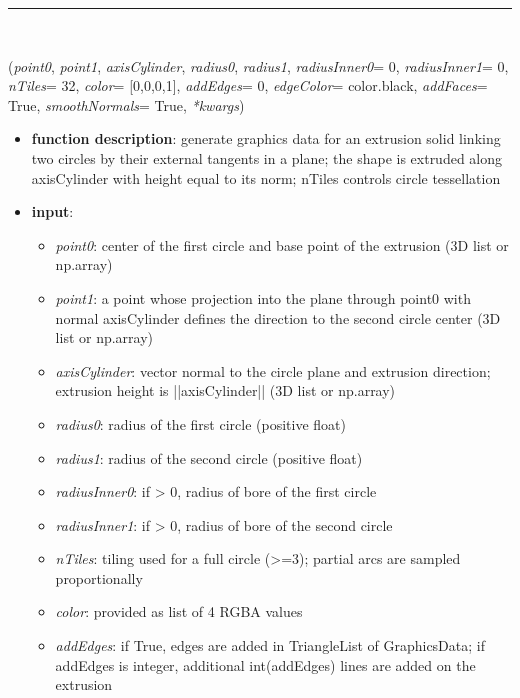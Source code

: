 \begin{itemize}[leftmargin=1.4cm]
\begin{itemize}[leftmargin=1.4cm]
\begin{itemize}[leftmargin=1.4cm]
\begin{itemize}[leftmargin=0.5cm]
\begin{itemize}[leftmargin=1.4cm]
\begin{itemize}[leftmargin=1.4cm]
\begin{itemize}[leftmargin=1.4cm]
\begin{itemize}[leftmargin=0.5cm]
\begin{itemize}[leftmargin=1.4cm]
%
\noindent\rule{8cm}{0.75pt}\vspace{1pt} \\ 
\begin{flushleft}
\label{sec:graphics:LinkedCylinders}
({\it point0}, {\it point1}, {\it axisCylinder}, {\it radius0}, {\it radius1}, {\it radiusInner0}= 0, {\it radiusInner1}= 0, {\it nTiles}= 32, {\it color}= [0,0,0,1], {\it addEdges}= 0, {\it edgeColor}= color.black, {\it addFaces}= True, {\it smoothNormals}= True, {\it **kwargs})
\end{flushleft}
\setlength{\itemindent}{0.7cm}
\begin{itemize}[leftmargin=0.7cm]
\item[--]
{\bf function description}: generate graphics data for an extrusion solid linking two circles by their external tangents in a plane; the shape is extruded along axisCylinder with height equal to its norm; nTiles controls circle tessellation
\item[--]
{\bf input}: \vspace{-6pt}
\begin{itemize}[leftmargin=1.2cm]
\setlength{\itemindent}{-0.7cm}
\item[]{\it point0}: center of the first circle and base point of the extrusion (3D list or np.array)
\item[]{\it point1}: a point whose projection into the plane through point0 with normal axisCylinder defines the direction to the second circle center (3D list or np.array)
\item[]{\it axisCylinder}: vector normal to the circle plane and extrusion direction; extrusion height is ||axisCylinder|| (3D list or np.array)
\item[]{\it radius0}: radius of the first circle (positive float)
\item[]{\it radius1}: radius of the second circle (positive float)
\item[]{\it radiusInner0}: if > 0, radius of bore of the first circle
\item[]{\it radiusInner1}: if > 0, radius of bore of the second circle
\item[]{\it nTiles}: tiling used for a full circle (>=3); partial arcs are sampled proportionally
\item[]{\it color}: provided as list of 4 RGBA values
\item[]{\it addEdges}: if True, edges are added in TriangleList of GraphicsData; if addEdges is integer, additional int(addEdges) lines are added on the extrusion

\end{itemize}
\end{itemize}
\end{itemize}
\end{itemize}
\end{itemize}
\end{itemize}
\end{itemize}
\end{itemize}
\end{itemize}
\end{itemize}
\end{itemize}
